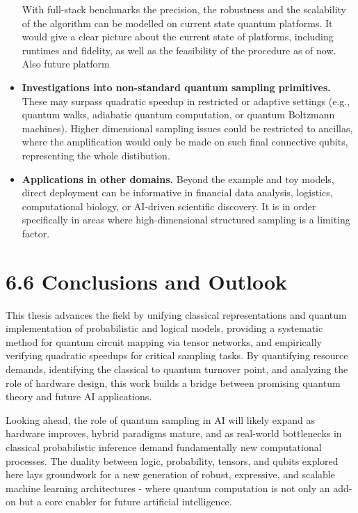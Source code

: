 \documentclass[encoding=utf8,british]{tumphthesis}
\begin{document}
\begin{itemize}
        With full-stack benchmarks the precision, the robustness and the scalability of the algorithm can be modelled on current state quantum platforms. It would give a clear picture about the current state of platforms, including runtimes and fidelity, as well as the feasibility of the procedure as of now.
        Also future platform   
        \item \textbf{Investigations into non-standard quantum sampling primitives.} These may surpass quadratic speedup in restricted or adaptive settings (e.g., quantum walks, adiabatic quantum computation, or quantum Boltzmann machines).
        Higher dimensional sampling issues could be restricted to ancillas, where the amplification would only be made on such final connective qubits, representing the whole distibution.
        \item \textbf{Applications in other domains.} Beyond the example and toy models, direct deployment can be informative in financial data analysis, logistics, computational biology, or AI-driven scientific discovery. It is in order specifically in areas where high-dimensional structured sampling is a limiting factor.
    \end{itemize}

    \section*{6.6 Conclusions and Outlook}
    This thesis advances the field by unifying classical representations and quantum implementation of probabilistic and logical models, providing a systematic method for quantum circuit mapping via tensor networks, and empirically verifying quadratic speedups for critical sampling tasks. 
    By quantifying resource demands, identifying the classical to quantum turnover point, and analyzing the role of hardware design, this work builds a bridge between promising quantum theory and future AI applications.

    Looking ahead, the role of quantum sampling in AI will likely expand as hardware improves, hybrid paradigms mature, and as real-world bottlenecks in classical probabilistic inference demand fundamentally new computational processes. The duality between logic, probability, tensors, and 
    qubits explored here lays groundwork for a new generation of robust, expressive, and scalable machine learning architectures - where quantum computation is not only an add-on but a core enabler for future artificial intelligence.
\end{document}
